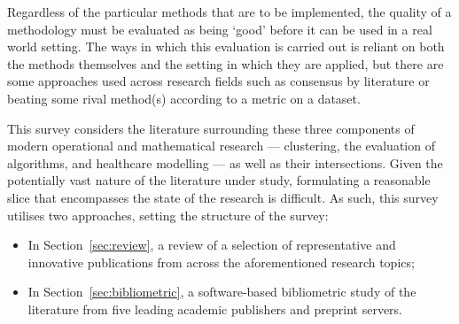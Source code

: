 Regardless of the particular methods that are to be implemented, the quality of
a methodology must be evaluated as being `good' before it can be used in a real
world setting. The ways in which this evaluation is carried out is reliant on
both the methods themselves and the setting in which they are applied, but there
are some approaches used across research fields such as consensus by literature
or beating some rival method(s) according to a metric on a dataset.

This survey considers the literature surrounding these three components of
modern operational and mathematical research --- clustering, the evaluation of
algorithms, and healthcare modelling --- as well as their intersections. Given
the potentially vast nature of the literature under study, formulating a
reasonable slice that encompasses the state of the research is difficult. As
such, this survey utilises two approaches, setting the structure of the survey:

\begin{itemize}
    \item In Section~\ref{sec:review}, a review of a selection of representative
        and innovative publications from across the aforementioned research
        topics;
    \item In Section~\ref{sec:bibliometric}, a software-based bibliometric study
        of the literature from five leading academic publishers and preprint
        servers.
\end{itemize}
